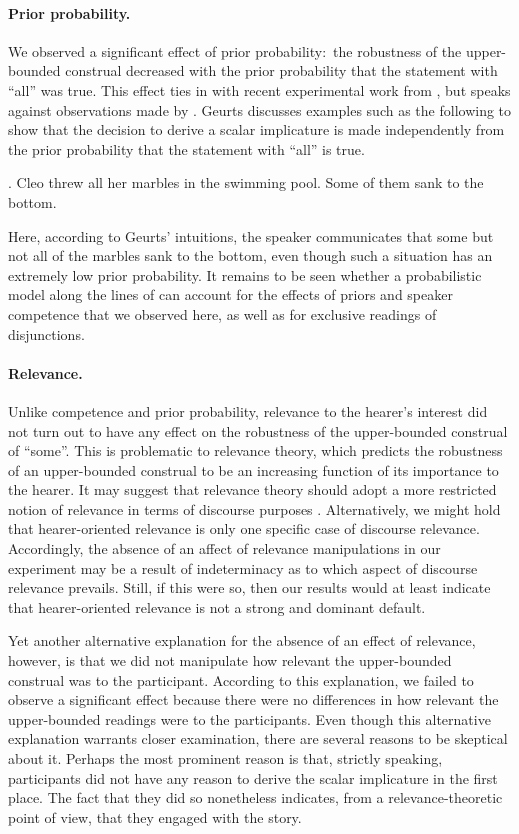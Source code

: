 \documentclass[12pt]{article}
\begin{document}
\paragraph{Prior probability.} We observed a significant effect of prior probability:\ the
robustness of the upper-bounded construal decreased with the prior probability that the
statement with ``all'' was true. This effect ties in with recent experimental work from
\citet{degen2015}, but speaks against observations made by \citet{geurts2010}. Geurts discusses
examples such as the following to show that the decision to derive a scalar implicature is made
independently from the prior probability that the statement with ``all'' is true.

\ex.	Cleo threw all her marbles in the swimming pool. Some of them sank to the bottom.

Here, according to Geurts' intuitions, the speaker communicates that some but not all of the
marbles sank to the bottom, even though such a situation has an extremely low prior
probability. It remains to be seen whether a probabilistic model along the lines of
\citet{degen2015} can account for the effects of priors and speaker competence that we observed
here, as well as for exclusive readings of disjunctions.

\paragraph{Relevance.} Unlike competence and prior probability, relevance to the hearer's
interest did not turn out to have any effect on the robustness of the upper-bounded construal
of ``some''. This is problematic to relevance theory, which predicts the robustness of an
upper-bounded construal to be an increasing function of its importance to the hearer. It may
suggest that relevance theory should adopt a more restricted notion of relevance in terms of
discourse purposes \citep{cummins2015}. Alternatively, we might hold that hearer-oriented
relevance is only one specific case of discourse relevance. Accordingly, the absence of an
affect of relevance manipulations in our experiment may be a result of indeterminacy as to
which aspect of discourse relevance prevails. Still, if this were so, then our results would at
least indicate that hearer-oriented relevance is not a strong and dominant default.

Yet another alternative explanation for the absence of an effect of relevance, however, is that
we did not manipulate how relevant the upper-bounded construal was to the
participant. According to this explanation, we failed to observe a significant effect because
there were no differences in how relevant the upper-bounded readings were to the
participants. Even though this alternative explanation warrants closer examination, there are
several reasons to be skeptical about it. Perhaps the most prominent reason is that, strictly
speaking, participants did not have any reason to derive the scalar implicature in the first
place. The fact that they did so nonetheless indicates, from a relevance-theoretic point of view,
that they engaged with the story.
\end{document}
